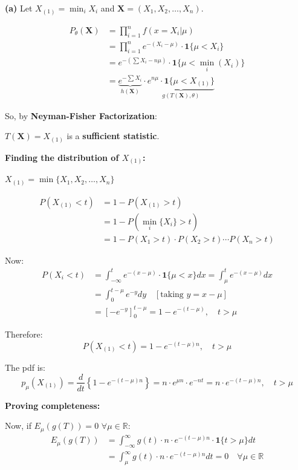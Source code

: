 \documentclass[12pt,a4paper,onecolumn]{exam}
\begin{document}
\begin{solution}
\textbf{(a)} Let $X_{(1)} = \min_i X_i$ and $\mathbf{X} = (X_1, X_2, \ldots, X_n)$.

\begin{align*}
P_{\theta}(\mathbf{X}) &= \prod_{i=1}^{n} f(x = X_i | \mu) \\
&= \prod_{i=1}^{n} e^{-(X_i - \mu)} \cdot \mathbf{1}\{\mu < X_i\} \\
&= e^{-(\sum X_i - n\mu)} \cdot \mathbf{1}\{\mu < \min_i(X_i)\} \\
&= \underbrace{e^{-\sum X_i}}_{h(\mathbf{X})} \cdot \underbrace{e^{n\mu} \cdot \mathbf{1}\{\mu < X_{(1)}\}}_{g(T(\mathbf{X}), \theta)}
\end{align*}

So, by \textbf{Neyman-Fisher Factorization}:

$T(\mathbf{X}) = X_{(1)}$ is a \textbf{sufficient statistic}.

\vspace{0.5em}
\textbf{Finding the distribution of $X_{(1)}$:}

$X_{(1)} = \min\{X_1, X_2, \ldots, X_n\}$

\begin{align*}
P(X_{(1)} < t) &= 1 - P(X_{(1)} > t) \\
&= 1 - P(\min_i\{X_i\} > t) \\
&= 1 - P(X_1 > t) \cdot P(X_2 > t) \cdots P(X_n > t)
\end{align*}

Now:
\begin{align*}
P(X_i < t) &= \int_{-\infty}^{t} e^{-(x-\mu)} \cdot \mathbf{1}\{\mu < x\} dx = \int_{\mu}^{t} e^{-(x-\mu)} dx \\
&= \int_{0}^{t-\mu} e^{-y} dy \quad [\text{taking } y = x - \mu] \\
&= \left[-e^{-y}\right]_0^{t-\mu} = 1 - e^{-(t-\mu)}, \quad t > \mu
\end{align*}

Therefore:
\[
P(X_{(1)} < t) = 1 - e^{-(t-\mu)n}, \quad t > \mu
\]

The pdf is:
\[
p_{\mu}(X_{(1)}) = \frac{d}{dt}\left\{1 - e^{-(t-\mu)n}\right\} = n \cdot e^{\mu n} \cdot e^{-nt} = n \cdot e^{-(t-\mu)n}, \quad t > \mu
\]

\textbf{Proving completeness:}

Now, if $E_{\mu}(g(T)) = 0$ $\forall \mu \in \mathbb{R}$:
\begin{align*}
E_{\mu}(g(T)) &= \int_{-\infty}^{\infty} g(t) \cdot n \cdot e^{-(t-\mu)n} \cdot \mathbf{1}\{t > \mu\} dt \\
&= \int_{\mu}^{\infty} g(t) \cdot n \cdot e^{-(t-\mu)n} dt = 0 \quad \forall \mu \in \mathbb{R}
\end{align*}


\end{solution}
\end{document}
